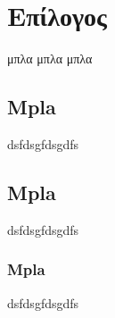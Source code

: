\chapter{Επίλογος}
\label{chap:conclusion}
μπλα μπλα μπλα

\section{Mpla}
dsfdsgfdsgdfs

\section{Mpla}
dsfdsgfdsgdfs
\subsection{Mpla}
dsfdsgfdsgdfs



